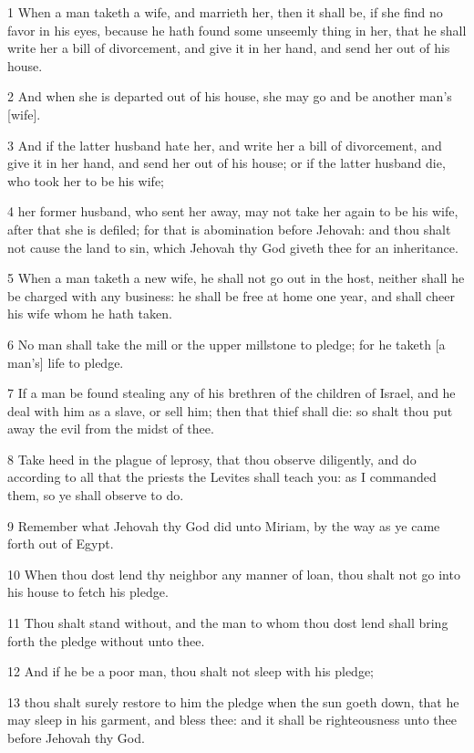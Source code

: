 \par 1 When a man taketh a wife, and marrieth her, then it shall be, if she find no favor in his eyes, because he hath found some unseemly thing in her, that he shall write her a bill of divorcement, and give it in her hand, and send her out of his house.
\par 2 And when she is departed out of his house, she may go and be another man's [wife].
\par 3 And if the latter husband hate her, and write her a bill of divorcement, and give it in her hand, and send her out of his house; or if the latter husband die, who took her to be his wife;
\par 4 her former husband, who sent her away, may not take her again to be his wife, after that she is defiled; for that is abomination before Jehovah: and thou shalt not cause the land to sin, which Jehovah thy God giveth thee for an inheritance.
\par 5 When a man taketh a new wife, he shall not go out in the host, neither shall he be charged with any business: he shall be free at home one year, and shall cheer his wife whom he hath taken.
\par 6 No man shall take the mill or the upper millstone to pledge; for he taketh [a man's] life to pledge.
\par 7 If a man be found stealing any of his brethren of the children of Israel, and he deal with him as a slave, or sell him; then that thief shall die: so shalt thou put away the evil from the midst of thee.
\par 8 Take heed in the plague of leprosy, that thou observe diligently, and do according to all that the priests the Levites shall teach you: as I commanded them, so ye shall observe to do.
\par 9 Remember what Jehovah thy God did unto Miriam, by the way as ye came forth out of Egypt.
\par 10 When thou dost lend thy neighbor any manner of loan, thou shalt not go into his house to fetch his pledge.
\par 11 Thou shalt stand without, and the man to whom thou dost lend shall bring forth the pledge without unto thee.
\par 12 And if he be a poor man, thou shalt not sleep with his pledge;
\par 13 thou shalt surely restore to him the pledge when the sun goeth down, that he may sleep in his garment, and bless thee: and it shall be righteousness unto thee before Jehovah thy God.
